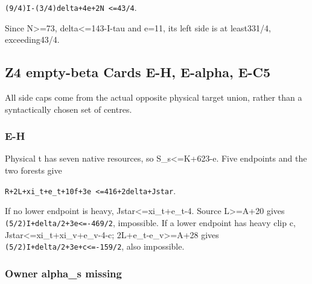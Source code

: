 \documentclass[10pt,a4paper]{article}
\theoremstyle{definition}
\begin{document}
\texttt{(9/\allowbreak{}4)I-(3/\allowbreak{}4)delta+\allowbreak{}4e+\allowbreak{}2N <=\allowbreak{}43/\allowbreak{}4}.

Since N\textgreater=\allowbreak{}73,\allowbreak{} delta\textless=\allowbreak{}143-I-tau and e=\allowbreak{}11,\allowbreak{} its left side
is at least331/4,\allowbreak{} exceeding43/4.

\hypertarget{z4-empty-beta-cards-e-h-e-alpha-e-c5}{%
\subsection{Z4 empty-beta Cards E-H,\allowbreak{} E-alpha,\allowbreak{}
E-C5}\label{z4-empty-beta-cards-e-h-e-alpha-e-c5}}

All side caps come from the actual opposite physical target union,\allowbreak{}
rather than a syntactically chosen set of centres.

\hypertarget{e-h}{%
\subsubsection{E-H}\label{e-h}}

Physical t has seven native resources,\allowbreak{} so S\_\allowbreak{}s\textless=\allowbreak{}K+\allowbreak{}623-e. Five
endpoints and the two forests give

\texttt{R+\allowbreak{}2L+\allowbreak{}xi\_\allowbreak{}\allowbreak{}t+\allowbreak{}e\_\allowbreak{}\allowbreak{}t+\allowbreak{}10f+\allowbreak{}3e <=\allowbreak{}416+\allowbreak{}2delta+\allowbreak{}Jstar}.

If no lower endpoint is heavy,\allowbreak{} Jstar\textless=\allowbreak{}xi\_\allowbreak{}t+\allowbreak{}e\_\allowbreak{}t-4. Source
L\textgreater=\allowbreak{}A+\allowbreak{}20 gives
\texttt{(5/\allowbreak{}2)I+\allowbreak{}delta/\allowbreak{}2+\allowbreak{}3e<=\allowbreak{}-469/\allowbreak{}2},\allowbreak{} impossible. If a
lower endpoint has heavy clip c,\allowbreak{} Jstar\textless=\allowbreak{}xi\_\allowbreak{}t+\allowbreak{}xi\_\allowbreak{}v+\allowbreak{}e\_\allowbreak{}v-4-c;
2L+\allowbreak{}e\_\allowbreak{}t-e\_\allowbreak{}v\textgreater=\allowbreak{}A+\allowbreak{}28 gives
\texttt{(5/\allowbreak{}2)I+\allowbreak{}delta/\allowbreak{}2+\allowbreak{}3e+\allowbreak{}c<=\allowbreak{}-159/\allowbreak{}2},\allowbreak{} also impossible.

\hypertarget{owner-alpha_s-missing}{%
\subsubsection{Owner alpha\_\allowbreak{}s missing}\label{owner-alpha_s-missing}}
\end{document}
